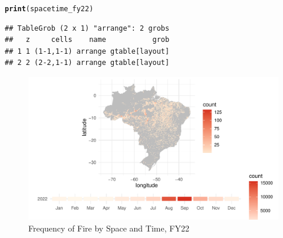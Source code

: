 \documentclass{article}\usepackage[]{graphicx}\usepackage[]{xcolor}
\makeatletter
\def\maxwidth{ %
  \ifdim\Gin@nat@width>\linewidth
    \linewidth
  \else
    \Gin@nat@width
  \fi
}
\newcommand{\hlstd}[1]{\textcolor[rgb]{0.345,0.345,0.345}{#1}}%
\newcommand{\hlkwd}[1]{\textcolor[rgb]{0.737,0.353,0.396}{\textbf{#1}}}%
\newenvironment{kframe}{%
 \def\at@end@of@kframe{}%
 \ifinner\ifhmode%
  \def\at@end@of@kframe{\end{minipage}}%
  \begin{minipage}{\columnwidth}%
 \fi\fi%
 \def\FrameCommand##1{\hskip\@totalleftmargin \hskip-\fboxsep
 \colorbox{shadecolor}{##1}\hskip-\fboxsep
     \hskip-\linewidth \hskip-\@totalleftmargin \hskip\columnwidth}%
 \MakeFramed {\advance\hsize-\width
   \@totalleftmargin\z@ \linewidth\hsize
   \@setminipage}}%
 {\par\unskip\endMakeFramed%
 \at@end@of@kframe}
\newenvironment{knitrout}{}{} %
\makeatother
\begin{document}
\begin{knitrout}
\begin{kframe}
\begin{alltt}
\hlkwd{print}\hlstd{(spacetime_fy22)}
\end{alltt}
\begin{verbatim}
## TableGrob (2 x 1) "arrange": 2 grobs
##   z     cells    name           grob
## 1 1 (1-1,1-1) arrange gtable[layout]
## 2 2 (2-2,1-1) arrange gtable[layout]
\end{verbatim}
\end{kframe}\begin{figure}[H]

{\centering \includegraphics[width=\maxwidth]{figure/beamer-spacetime-fy22-1} 

}

\caption[Frequency of Fire by Space and Time, FY22]{Frequency of Fire by Space and Time, FY22}\label{fig:spacetime-fy22}
\end{figure}

\end{knitrout}
\end{document}
